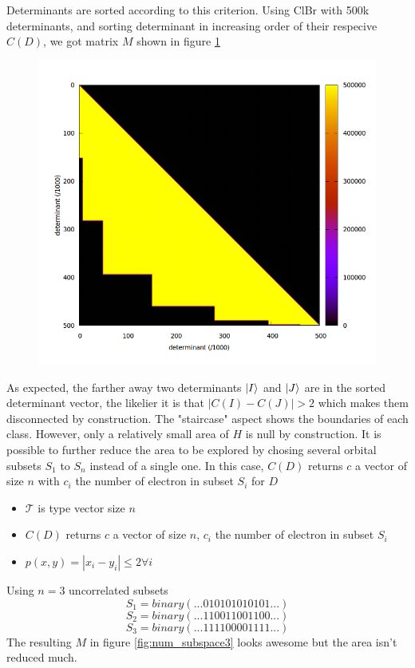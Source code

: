 \documentclass[./thesis.tex]{subfiles}
\begin{document}
Determinants are sorted according to this criterion. Using ClBr with 500k determinants, and sorting determinant in increasing order of their respecive $C(D)$, we got matrix $M$ shown in figure \ref{fig:num_subspace}

\begin{figure}[h!]
	\begin{center}
		\includegraphics[width=0.6\columnwidth]{figures/davidson/num_subspace}
		\caption{{\label{fig:num_subspace}
		}}
	\end{center}
\end{figure}
    
As expected, the farther away two determinants $\ket I$ and $\ket J$ are in the sorted determinant vector, the likelier it is that $|C(I)-C(J)| > 2$ which makes them disconnected by construction. The "staircase" aspect shows the boundaries of each class.
However, only a relatively small area of $H$ is null by construction. It is possible to further reduce the area to be explored by chosing several orbital subsets $S_1$ to $S_n$ instead of a single one. In this case, $C(D)$ returns $c$ a vector of size $n$ with $c_{i}$ the number of electron in subset $S_i$ for $D$

\begin{itemize}
	\item
	$\mathcal{T}$ is type vector size $n$
	\item
	$C(D)$ returns $c$ a vector of size $n$, $c_i$ the number of electron in subset $S_i$
	\item
	$p(x, y) = |x_i - y_i| \leq 2 \forall i$
\end{itemize}



Using $n=3$ uncorrelated subsets
\begin{equation}
S_1 = binary(...010101010101...)
\end{equation}
\begin{equation}
S_2 = binary(...110011001100...)
\end{equation}
\begin{equation}
S_3 = binary(...111100001111...)
\end{equation}
The resulting $M$ in figure \ref{fig:num_subspace3} looks awesome but the area isn't reduced much.
\end{document}
